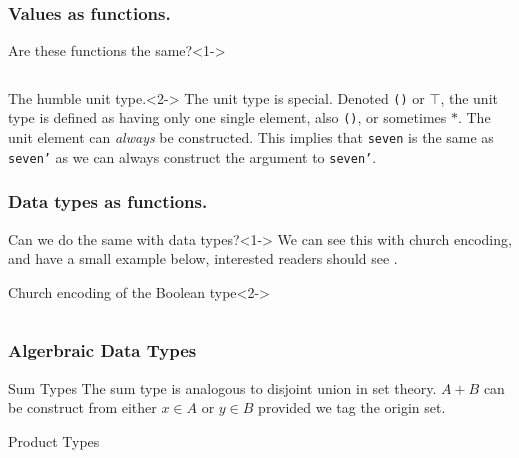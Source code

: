 \documentclass
  [hyperref={colorlinks = true,linkcolor = blue, 
             citecolor = blue, urlcolor = blue}
  ]{beamer}
\begin{document}
\begin{frame}[fragile]
\frametitle{Values as functions.}
  \begin{block}{Are these functions the same?}<1->
  \inputminted{idris}{../Code/src/Values.idr}
  \end{block}

  \begin{block}{The humble unit type.}<2->
  The unit type is special.
  Denoted \texttt{()} or $\top$, the unit type is
  defined as having only one single element, also
  \texttt{()}, or sometimes $\ast$.
  The unit element can \textit{always} be constructed.
  This implies that \texttt{seven} is the same as
  \texttt{seven'} as we can always construct the 
  argument to \texttt{seven'}.
  \end{block}
\end{frame}

\begin{frame}[fragile]
\frametitle{Data types as functions.}
  \begin{block}{Can we do the same with data types?}<1->
    We can see this with church encoding, and have a
    small example below, interested readers should see
    \cite[p. 58-68]{pierce2002types}.
  \end{block}

  \begin{block}{Church encoding of the Boolean type}<2->
    \inputminted{idris}{../Code/src/ChurchBools.idr}
  \end{block}
\end{frame}

\begin{frame}[fragile]
\frametitle{Algerbraic Data Types}
  \begin{block}{Sum Types}
  The sum type is analogous to disjoint union in set theory.
  $A + B$ can be construct from either $x \in A$ or $y \in B$
  provided we tag the origin set.
  \end{block}

  \begin{block}{Product Types}
  
  \end{block}
\end{frame}
\end{document}
